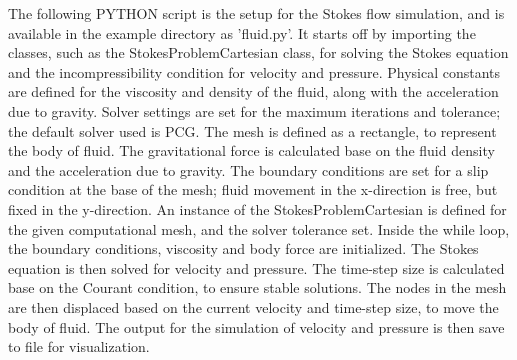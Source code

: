 The following PYTHON script is the setup for the Stokes flow simulation, and is available in the example directory as 'fluid.py'. It starts off by importing the classes, such as the StokesProblemCartesian class, for solving the Stokes equation and the incompressibility condition for velocity and pressure. Physical constants are defined for the viscosity and density of the fluid, along with the acceleration due to gravity. Solver settings are set for the maximum iterations and tolerance; the default solver used is PCG. The mesh is defined as a rectangle, to represent the body of fluid. The gravitational force is calculated base on the fluid density and the acceleration due to gravity. The boundary conditions are set for a slip condition at the base of the mesh; fluid movement in the x-direction is free, but fixed in the y-direction. An instance of the StokesProblemCartesian is defined for the given computational mesh, and the solver tolerance set. Inside the while loop, the boundary conditions, viscosity and body force are initialized. The Stokes equation is then solved for velocity and pressure. The time-step size is calculated base on the Courant condition, to ensure stable solutions. The nodes in the mesh are then displaced based on the current velocity and time-step size, to move the body of fluid. The output for the simulation of velocity and pressure is then save to file for visualization. 
%
